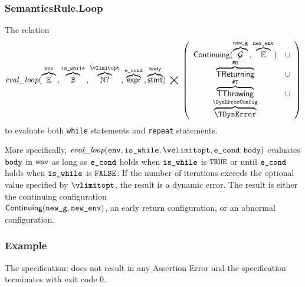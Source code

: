 \subsubsection{SemanticsRule.Loop\label{sec:SemanticsRule.Loop}}
The relation
\hypertarget{def-evalloop}{}
\[
  \evalloop{
    \overname{\envs}{\env} \aslsep
    \overname{\Bool}{\iswhile} \aslsep
    \overname{\N?}{\vlimitopt} \aslsep
    \overname{\expr}{\econd} \aslsep
    \overname{\stmt}{\vbody}}
  \;\aslrel\;
  \left(
    \begin{array}{cl}
      \Continuing(\overname{\XGraphs}{\newg} \aslsep \overname{\envs}{\newenv}) & \cup \\
      \overname{\TReturning}{\ReturningConfig} & \cup \\
      \overname{\TThrowing}{\ThrowingConfig} & \cup \\
      \overname{\TDynError}{\DynErrorConfig} &
    \end{array}
  \right)
\]
to evaluate both \texttt{while} statements and \texttt{repeat} statements.

More specifically, $\evalloop{\env, \iswhile, \velimitopt, \econd, \vbody}$
evaluates $\texttt{body}$ in $\texttt{env}$ as long as $\texttt{e\_cond}$ holds when $\texttt{is\_while}$ is $\texttt{TRUE}$
or until $\texttt{e\_cond}$ holds when $\texttt{is\_while}$ is $\texttt{FALSE}$.
If the number of iterations exceeds the optional value specified by $\vlimitopt$,
the result is a dynamic error.
The result is either the continuing configuration \\ $\textsf{Continuing}(\texttt{new\_g},\texttt{new\_env})$,
an early return configuration, or an abnormal configuration.

\subsubsection{Example}
The specification:
does not result in any Assertion Error and the specification terminates with exit
code $0$.

